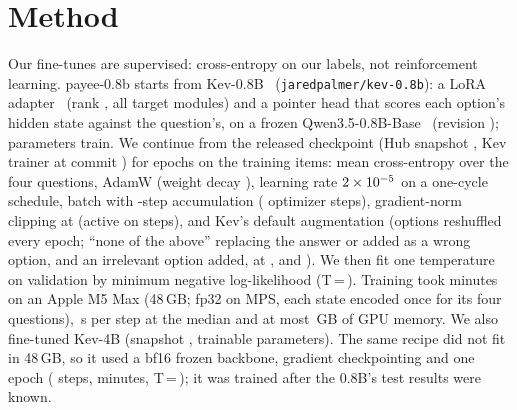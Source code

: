 \documentclass[conference]{IEEEtran}
\begin{document}
\section{Method}
Our fine-tunes are supervised: cross-entropy on our labels, not reinforcement learning. payee-0.8b starts from
Kev-0.8B~\cite{palmer2026kev} (\texttt{jaredpalmer/kev-0.8b}): a LoRA adapter~\cite{hu2022lora} (rank \NRank{}, all target
modules) and a pointer head that scores each option's hidden state against the question's, on a frozen
Qwen3.5-0.8B-Base~\cite{qwen2026qwen35base} (revision \texttt{\NBaseRevision}); \NParams{} parameters train. We continue
from the released checkpoint (Hub snapshot \texttt{\NInitSnapshot}, Kev trainer at commit \texttt{\NKevCommit}) for
\NEpochs{} epochs on the \NNTrain{} training items: mean cross-entropy over the four questions, AdamW (weight decay
\NWeightDecay{}), learning rate $2\times10^{-5}$ on a one-cycle schedule, batch \NBatch{} with \NAccum-step accumulation
(\NTrainSteps{} optimizer steps), gradient-norm clipping at \NClipNorm{} (active on \NClippedSteps{} steps), and Kev's
default augmentation (options reshuffled every epoch; ``none of the above'' replacing the answer or added as a wrong
option, and an irrelevant option added, at \NPNone{}, \NPNoneDistract{} and \NPDistract{}). We then fit one temperature on validation by minimum negative log-likelihood
(T\,=\,\NTempOurs{}). Training took \NTrainMin{} minutes on an Apple M5 Max (48\,GB; fp32 on MPS, each
state encoded once for its four questions), \NTrainStep{}\,s per step at the median and at most \NTrainPeakGpu{}\,GB of
GPU memory. We also fine-tuned Kev-4B (snapshot \texttt{\NInitSnapshotFour}, \NParamsFour{} trainable parameters). The
same recipe did not fit in 48\,GB, so it used a bf16 frozen backbone, gradient checkpointing and one epoch
(\NFourSteps{} steps, \NFourMin{} minutes, T\,=\,\NTempFour{}); it was trained after the 0.8B's test results were known.
\NOpenModels{}
\end{document}
